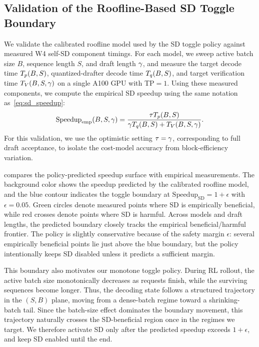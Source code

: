 \subsection{Validation of the Roofline-Based SD Toggle Boundary}
\label{app:toggle_validation}

We validate the calibrated roofline model used by the SD toggle policy against measured W4 self-SD component timings.
For each model, we sweep active batch size $B$, sequence length $S$, and draft length $\gamma$, and measure the target decode time $T_p(B,S)$, quantized-drafter decode time $T_q(B,S)$, and target verification time $T_V(B,S,\gamma)$ on a single A100 GPU with TP$=1$.
Using these measured components, we compute the empirical SD speedup using the same notation as~\cref{eq:sd_speedup}:
\begin{equation}
\mathrm{Speedup}_{\mathrm{emp}}(B,S,\gamma)
=
\frac{\tau T_p(B,S)}
{\gamma T_q(B,S) + T_V(B,S,\gamma)}.
\label{eq:empirical_sd_speedup}
\end{equation}
For this validation, we use the optimistic setting $\tau=\gamma$, corresponding to full draft acceptance, to isolate the cost-model accuracy from block-efficiency variation.

 compares the policy-predicted speedup surface with empirical measurements.
The background color shows the speedup predicted by the calibrated roofline model, and the blue contour indicates the toggle boundary at $\mathrm{Speedup}_{\mathrm{SD}}=1+\epsilon$ with $\epsilon=0.05$.
Green circles denote measured points where SD is empirically beneficial, while red crosses denote points where SD is harmful.
Across models and draft lengths, the predicted boundary closely tracks the empirical beneficial/harmful frontier.
The policy is slightly conservative because of the safety margin $\epsilon$: several empirically beneficial points lie just above the blue boundary, but the policy intentionally keeps SD disabled unless it predicts a sufficient margin.

This boundary also motivates our monotone toggle policy.
During RL rollout, the active batch size monotonically decreases as requests finish, while the surviving sequences become longer.
Thus, the decoding state follows a structured trajectory in the $(S,B)$ plane, moving from a dense-batch regime toward a shrinking-batch tail.
Since the batch-size effect dominates the boundary movement, this trajectory naturally crosses the SD-beneficial region once in the regimes we target.
We therefore activate SD only after the predicted speedup exceeds $1+\epsilon$, and keep SD enabled until the end.
